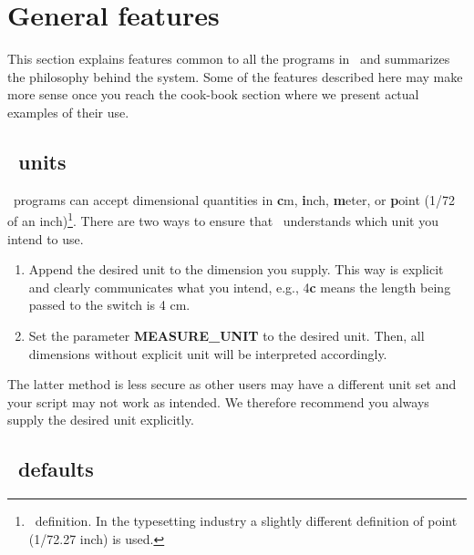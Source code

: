 %
%
\chapter{General features}
\label{ch:4}
\thispagestyle{headings}

This section explains features common to all the programs
in \GMT\ and summarizes the philosophy behind the system.  Some
of the features described here may make more sense once you reach
the cook-book section where we present actual examples of their use. 

\section{\gmt\ units}

\GMT\ programs can accept dimensional quantities in \textbf{c}m, \textbf{i}nch,
\textbf{m}eter, or \textbf{p}oint (1/72 of an inch)\footnote{\PS\ definition.
In the typesetting industry a slightly different definition of point
(1/72.27 inch) is used.}.  There are two ways to ensure that \GMT\ understands
which unit you intend to use.

\begin{enumerate}
\item Append the desired unit to the dimension you supply.  This
way is explicit and clearly communicates what you intend, e.g.,
4\textbf{c} means the length being passed to the  switch is 4 cm.

\item Set the parameter \textbf{MEASURE\_UNIT} to the desired unit.  Then, all
dimensions without explicit unit will be interpreted accordingly.

\end{enumerate}

The latter method is less secure as other users may have a different unit
set and your script may not work as intended.  We therefore recommend
you always supply the desired unit explicitly.

\section{\gmt\ defaults}
\label{sec:gmtdefaults}
